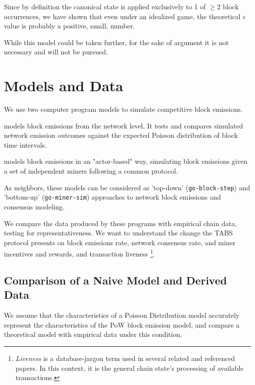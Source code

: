 \documentclass[11pt]{article}
\theoremstyle{plain}
\begin{document}
Since by definition the canonical state is applied exclusively to 1 of
$\geq 2$ block occurrences, we have shown that even under an idealized game,
the theoretical $\epsilon$ value is probably a positive, small, number.

While this model could be taken further, for the sake of argument it is not
necessary and will not be pursued.


\section{\normalsize{Models and Data}}

We use two computer program models to simulate competitive block emissions.

 models block emissions from the network level.
It tests and compares simulated network emission outcomes
against the expected Poisson distribution of block time intervals.

 models block emissions in an "actor-based" way,
simulating block emissions given a set of independent miners following a common protocol.

As neighbors, these models can be considered as 'top-down' (\texttt{go-block-step}) and 'bottom-up' (\texttt{go-miner-sim})
approaches to network block emissions and consensus modeling.

We compare the data produced by these programs with empirical chain data, testing for representativeness.
We want to understand the change the TABS protocol presents on block emissions rate,
network consensus rate, and miner incentives and rewards, and transaction liveness\nolinebreak
\footnote{\emph{Liveness} is a database-jargon term used in several related and referenced papers.
In this context, it is the general chain state's processing of available transactions.
}.

\subsection{\normalsize{Comparison of a Naive Model and Derived Data}}

We assume that the characteristics of a Poisson Distribution model
accurately represent the characteristics of the PoW block emission model,
and compare a theoretical model with empirical data under this condition.
\end{document}
